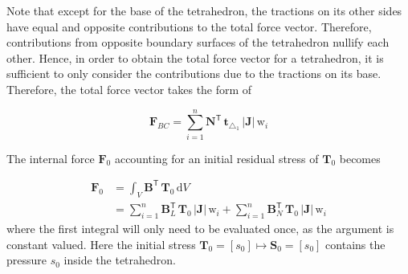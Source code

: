 Note that except for the base of the tetrahedron, the tractions on its other sides have equal and opposite contributions to the total force vector. Therefore, contributions from opposite boundary surfaces of the tetrahedron nullify each other. Hence, in order to obtain the total force vector for a tetrahedron, it is sufficient to only consider the contributions due to the tractions on its base. Therefore, the total force vector takes the form of

\begin{equation}
\mathbf{F}_{BC} = \sum_{i=1}^{n} \mathbf{N}^{\mathsf{T}} \, \mathbf{t}_{\triangle_{1}} \,|\mathbf{J}| \, \mathrm{w}_i 
\end{equation}

The internal force $\boldsymbol{F}_0$ accounting for an initial residual stress of $\boldsymbol{T}_0$ becomes

\begin{subequations}
	\begin{align}
		\boldsymbol{F}_0 & = \int_{V} \mathbf{B}^{\mathsf{T}} \,	\boldsymbol{T}_0 \, 
		\mathrm{d} V \\
		& =  \sum_{i=1}^{n} \mathbf{B}_L^{\mathsf{T}} \,	\boldsymbol{T}_0 \, | \mathbf{J} | \, \mathrm{w}_i +  \sum_{i=1}^{n} \mathbf{B}_N^{\mathsf{T}} \,	\boldsymbol{T}_0 \, | \mathbf{J} | \, \mathrm{w}_i
	\end{align}
\end{subequations}
where the first integral will only need to be evaluated once, as the argument is constant valued.
Here the initial stress $\mathbf{T}_0 = [s_0] \mapsto \mathbf{S}_0 = [s_0]$  contains the pressure $s_0$ inside the tetrahedron.


